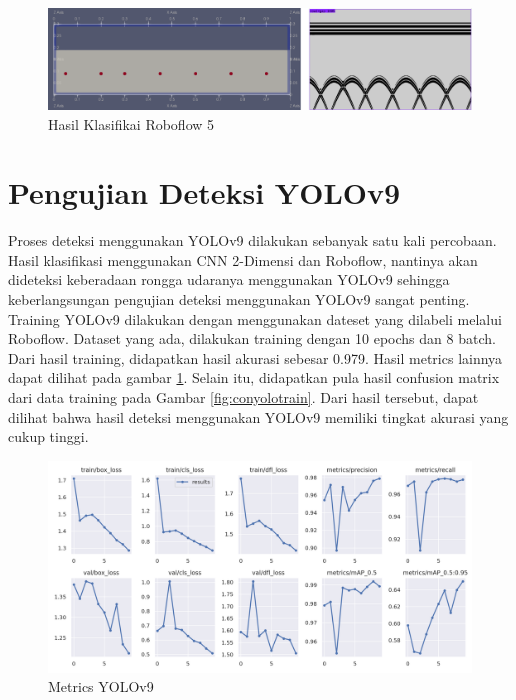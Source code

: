 \begin{figure} [H] \centering
    \includegraphics[scale=0.2]{gambar/bab4/robon.png}
    \caption{Hasil Klasifikai Roboflow 5}
\end{figure}

\section{Pengujian Deteksi YOLOv9}
\label{sec:PengujianYOLOv9}
Proses deteksi menggunakan YOLOv9 dilakukan sebanyak satu kali percobaan. Hasil klasifikasi menggunakan CNN 2-Dimensi dan Roboflow, nantinya akan dideteksi keberadaan rongga udaranya menggunakan YOLOv9 sehingga keberlangsungan pengujian deteksi menggunakan YOLOv9 sangat penting. Training YOLOv9 dilakukan dengan menggunakan dateset yang dilabeli melalui Roboflow. Dataset yang ada, dilakukan training dengan 10 epochs dan 8 batch. Dari hasil training, didapatkan hasil akurasi sebesar 0.979. Hasil metrics lainnya dapat dilihat pada gambar \ref{fig:metrics}. Selain itu, didapatkan pula hasil confusion matrix dari data training pada Gambar \ref{fig:conyolotrain}. Dari hasil tersebut, dapat dilihat bahwa hasil deteksi menggunakan YOLOv9 memiliki tingkat akurasi yang cukup tinggi.

\begin{figure} [H] \centering
    \includegraphics[scale=0.5]{gambar/bab4/metrics.png}
    \caption{Metrics YOLOv9}
    \label{fig:metrics}
\end{figure}

